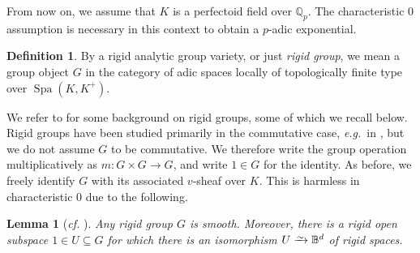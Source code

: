 \documentclass[11pt]{amsart}
\numberwithin{equation}{section}
\newtheorem{Lemma}[thm]{Lemma}
\theoremstyle{definition}
\newtheorem{Definition}[thm]{Definition}
\theoremstyle{remark}
\newcommand*{\lowsim}{\vbox to 0pt{\vss\hbox{$\scriptstyle\sim$}\vskip-2pt}}
\newcommand*{\isomarrow}{\xrightarrow{\lowsim}}
\newcommand{\B}{\mathbb{B}}
\newcommand{\Q}{\mathbb{Q}}
\newcommand{\Spa}{\operatorname{Spa}}
\begin{document}
From now on, we assume that $K$ is a perfectoid field over $\Q_p.$ The characteristic $0$ assumption is necessary in this context to obtain a $p$-adic exponential.

\begin{Definition}
  By a rigid analytic group variety, or just \emph{rigid group}, we mean a group object $G$ in the category of adic spaces locally of topologically finite type over $\Spa(K,K^+)$.
 \end{Definition}

We refer to \cite[Sections~1.2--1.3]{Fargues-groupes-analytiques} for some background on rigid groups, some of which we recall below.
  Rigid groups have been studied primarily in the commutative case, \textit{e.g.}~in \cite{Lutkebohmert_structure_of_bounded}, but we do not assume $G$ to be commutative. We therefore write the group operation multiplicatively as $m\colon G\times G\to G$, and write $1\in G$ for the identity.
As before, we freely identify $G$ with its associated $v$-sheaf over $K$. This is harmless in characteristic $0$ due to the following. 

\begin{Lemma}[\textit{cf.} {\cite[Proposition 1]{Fargues-groupes-analytiques}}]\label{l:G-smooth}
	Any rigid group $G$ is smooth. Moreover, there is a rigid open subspace $1\in U\subseteq G$ for which there is an isomorphism $U\isomarrow \B^d$ of rigid spaces.
\end{Lemma}
\end{document}
